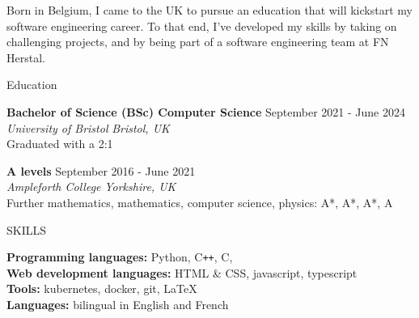 \documentclass{resume} %
\begin{document}


{Born in Belgium, I came to the UK to pursue an education that will kickstart my software engineering career. To that end, I've developed my skills by taking on challenging projects, and by being part of a software engineering team at FN Herstal.}



\begin{rSection}{Education}

{\bf Bachelor of Science (BSc) Computer Science} \hfill {September 2021 - June 2024} \\
\textit{University of Bristol} \hfill \textit{Bristol, UK} \\
Graduated with a 2:1

{\bf A levels} \hfill {September 2016 - June 2021} \\
\textit{Ampleforth College} \hfill \textit{Yorkshire, UK} \\
Further mathematics, mathematics, computer science, physics: A*, A*, A*, A

\end{rSection}

\begin{rSection}{SKILLS}

{\bf Programming languages:} Python, C\texttt{++}, C, \\
{\bf Web development languages:} HTML \& CSS, javascript, typescript \\
{\bf Tools:} kubernetes, docker, git, LaTeX \\
{\bf Languages:} bilingual in English and French

\end{rSection}
\end{document}
